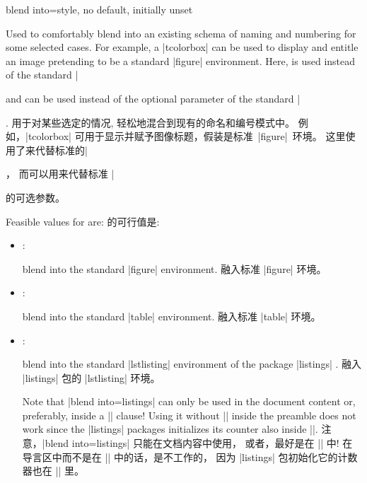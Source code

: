 \begin{newTcbKey}[][doc new=2014-09-19]{blend into}{=}{style, no default, initially unset}
\begin{stripedbox}
Used to comfortably blend into an existing schema of naming and numbering for
some selected cases. For example, a |tcolorbox| can be used to display
and entitle an image pretending to be a standard |figure| environment.
Here,  is used instead of the standard |\caption|
and  can be used instead of the optional parameter
of the standard |\caption|.
\tcblower
用于对某些选定的情况, 轻松地混合到现有的命名和编号模式中。%
例如，|tcolorbox| 可用于显示并赋予图像标题，假装是标准~|figure|~环境。%
这里使用了来代替标准的|\caption|，%
而可以用来代替标准 |\caption| 的可选参数。%
\end{stripedbox}

\begin{stripedbox}
Feasible values for  are:
\tcblower
{}的可行值是:
\end{stripedbox}
\begin{itemize}
\item{}: 
\begin{stripedbox}%
blend into the standard |figure| environment.
\tcblower
融入标准 |figure| 环境。
\end{stripedbox}

\item{}:
\begin{stripedbox}
blend into the standard |table| environment.
\tcblower
融入标准 |table| 环境。
\end{stripedbox}
\item{}: 
\begin{stripedbox}
blend into the standard |lstlisting| environment
of the package |listings| %
.
\tcblower
融入 |listings| 包的 |lstlisting| 环境。
\end{stripedbox}

\begin{marker}
\begin{stripedbox}[blank]
Note that |blend into=listings| can only be used in the document content
or, preferably, inside a |\AtBeginDocument| clause! Using it without
|\AtBeginDocument| inside the preamble does not work since the |listings|
packages initializes its counter also inside |\AtBeginDocument|.
\tcblower
注意，|blend into=listings| 只能在文档内容中使用，%
或者，最好是在 |\AtBeginDocument| 中!%
在导言区中而不是在 |\AtBeginDocument| 中的话，是不工作的，%
因为 |listings| 包初始化它的计数器也在 |\AtBeginDocument| 里。
\end{stripedbox}
\end{marker}
\end{itemize}
\end{newTcbKey}

